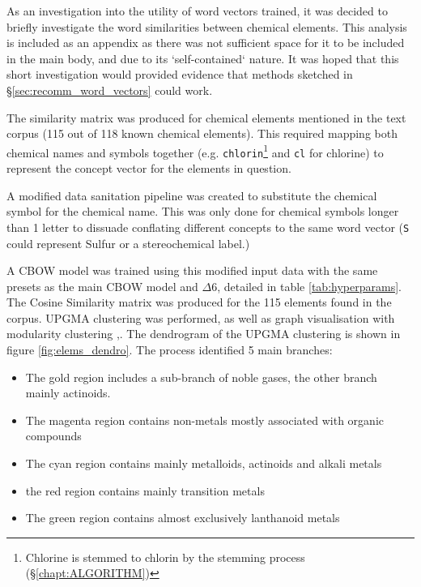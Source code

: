 \addtocounter{page}{1}
\label{sec:Elemental_Analysis}
As an investigation into the utility of word vectors trained, it was decided to briefly investigate the word similarities between chemical elements. This analysis is included as an appendix as there was not sufficient space for it to be included in the main body, and due to its `self-contained` nature. It was hoped that this short investigation would provided evidence that methods sketched in \S\ref{sec:recomm_word_vectors} could work.

The similarity matrix was produced for chemical elements mentioned in the text corpus (115 out of 118 known chemical elements). This required mapping both chemical names and symbols together (e.g. \texttt{chlorin}\footnote{Chlorine is stemmed to chlorin by the stemming process (\S\ref{chapt:ALGORITHM}) }  and \texttt{cl} for chlorine) to represent the concept vector for the elements in question.

A modified data sanitation pipeline was created to substitute the chemical symbol for the chemical name. This was only done for chemical symbols longer than 1 letter to dissuade conflating different concepts to the same word vector (\texttt{S} could represent Sulfur or a stereochemical label.)
 
A CBOW model was trained using this modified input data with the same presets as the main CBOW model and $\Delta6$, detailed in table \ref{tab:hyperparams}. The Cosine Similarity matrix was produced for the 115 elements found in the corpus. UPGMA clustering was performed\cite{scikitlearn}, as well as graph visualisation with modularity clustering \cite{modularity1},\cite{modularity2}. The dendrogram of the UPGMA clustering is shown in figure \ref{fig:elems_dendro}. The process identified 5 main branches:
\begin{itemize}
\itemsep-0.5em
\item The gold region includes a sub-branch of noble gases, the other branch mainly actinoids.
\item The magenta region contains non-metals mostly associated with organic compounds
\item The cyan region contains mainly metalloids, actinoids and alkali metals
\item the red region contains mainly transition metals
\item The green region contains almost exclusively lanthanoid metals 
\end{itemize}


